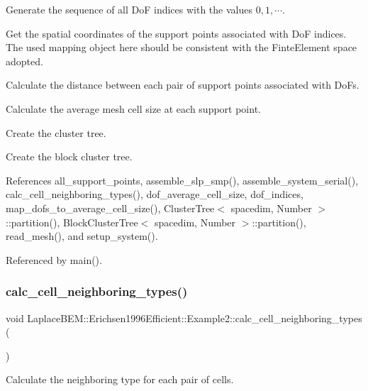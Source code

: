 Generate the sequence of all DoF indices with the values $0, 1, \cdots$.

Get the spatial coordinates of the support points associated with DoF indices. The used {\ttfamily mapping} object here should be consistent with the Finte\+Element space adopted.

Calculate the distance between each pair of support points associated with Do\+Fs.

Calculate the average mesh cell size at each support point.

Create the cluster tree.

Create the block cluster tree.

References all\+\_\+support\+\_\+points, assemble\+\_\+slp\+\_\+smp(), assemble\+\_\+system\+\_\+serial(), calc\+\_\+cell\+\_\+neighboring\+\_\+types(), dof\+\_\+average\+\_\+cell\+\_\+size, dof\+\_\+indices, map\+\_\+dofs\+\_\+to\+\_\+average\+\_\+cell\+\_\+size(), Cluster\+Tree$<$ spacedim, Number $>$\+::partition(), Block\+Cluster\+Tree$<$ spacedim, Number $>$\+::partition(), read\+\_\+mesh(), and setup\+\_\+system().



Referenced by main().

\mbox{\label{classLaplaceBEM_1_1Erichsen1996Efficient_1_1Example2_a6a47dc2d39a4a3ff6b446e43e520bde7}} 
\subsubsection{\texorpdfstring{calc\+\_\+cell\+\_\+neighboring\+\_\+types()}{calc\_cell\_neighboring\_types()}}
{\footnotesize\ttfamily void Laplace\+B\+E\+M\+::\+Erichsen1996\+Efficient\+::\+Example2\+::calc\+\_\+cell\+\_\+neighboring\+\_\+types (\begin{DoxyParamCaption}{ }\end{DoxyParamCaption})\hspace{0.3cm}{\ttfamily [private]}}

Calculate the neighboring type for each pair of cells. 

